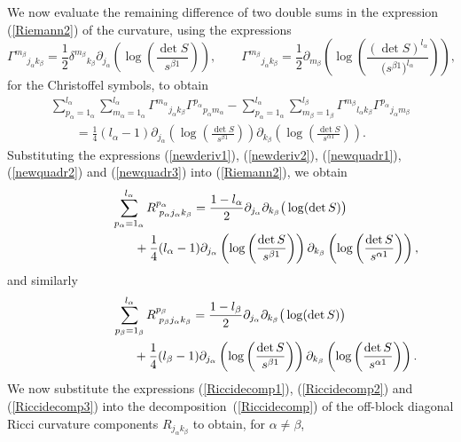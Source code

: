 \documentclass[pdftex]{sigma}
\numberwithin{equation}{section}
\newcommand{\jalpha}{j_{\alpha}}
\newcommand{\kbeta}{k_{\beta}}
\newcommand{\malpha}{m_{\alpha}}
\newcommand{\mbeta}{m_{\beta}}
\newcommand{\lbeta}{l_{\beta}}
\newcommand{\lalpha}{l_{\alpha}}
\newcommand{\palpha}{p_{\alpha}}
\newcommand{\pbeta}{p_{\beta}}
\begin{document}
We now evaluate the remaining difference of two double sums in the expression (\ref{Riemann2}) of the curvature, using the expressions
\[
{\Gamma^{\mbeta}}_{\jalpha \kbeta}=\frac{1}{2}{\delta^{\mbeta}}_{\kbeta}\partial_{\jalpha}\left(\log\left(\frac{\det S}{s^{\beta 1}}  \right)\right), \qquad {\Gamma^{\mbeta}}_{\jalpha \kbeta} = \frac{1}{2}\partial_{\mbeta}\left(\log\left(\frac{(\det S)^{\lalpha}}{\big(s^{\beta 1}\big)^{\lalpha}} \right)\right),
\]
for the Christoffel symbols, to obtain
\begin{gather}
\sum_{\palpha=1_{\alpha}}^{\lalpha}\sum_{\malpha = 1_{\alpha}}^{\lalpha}{\Gamma^{\malpha}}_{\jalpha \kbeta}{\Gamma^{\palpha}}_{\palpha \malpha}-\sum_{\palpha=1_{\alpha}}^{\lalpha}\sum_{\mbeta=1_{\beta}}^{\lbeta}{\Gamma^{\mbeta}}_{\lalpha \kbeta}{\Gamma^{\palpha}}_{\jalpha \mbeta}\nonumber\\
\qquad{} =\frac{1}{4}(\lalpha-1)\partial_{\jalpha}\left(\log \left(\frac{\det S}{s^{\beta 1}}\right)\right)\partial_{\kbeta}\left(\log\left(\frac{\det S}{s^{\alpha 1}} \right)\right).\label{newquadr3}
\end{gather}
Substituting the expressions (\ref{newderiv1}), (\ref{newderiv2}), (\ref{newquadr1}), (\ref{newquadr2}) and (\ref{newquadr3}) into (\ref{Riemann2}), we obtain
\begin{gather}
\sum_{\palpha=1_{\alpha}}^{\lalpha}R^{\palpha}_{{\phantom l} \palpha \jalpha \kbeta}= \frac{1-\lalpha}{2} \partial_{\jalpha}\partial_{\kbeta} \big(\log(\det S)\big)\nonumber\\
\hphantom{\sum_{\palpha=1_{\alpha}}^{\lalpha}R^{\palpha}_{{\phantom l} \palpha \jalpha \kbeta}=}{}
+\frac{1}{4}(\lalpha-1)\partial_{\jalpha}\left(\log\left(\frac{\det S}{s^{\beta 1}}\right)\right)\partial_{\kbeta}\left(\log\left(\frac{\det S}{s^{\alpha 1}}\right)\right),\label{Riccidecomp2}
\end{gather}
and similarly
\begin{gather}\label{Riccidecomp3}
\sum_{\pbeta=1_{\beta}}^{\lalpha}R^{\pbeta}_{{\phantom l} \pbeta \jalpha \kbeta}=\frac{1-\lbeta}{2}\partial_{\jalpha}\partial_{\kbeta} \big(\log(\det S)\big)\nonumber\\
\hphantom{\sum_{\pbeta=1_{\beta}}^{\lalpha}R^{\pbeta}_{{\phantom l} \pbeta \jalpha \kbeta}=}{}
+\frac{1}{4}(\lbeta-1)\partial_{\jalpha}\left(\log\left(\frac{\det S}{s^{\beta 1}}\right)\right)\partial_{\kbeta}\left(\log\left(\frac{\det S}{s^{\alpha 1}}\right)\right).
\end{gather}
We now substitute the expressions (\ref{Riccidecomp1}), (\ref{Riccidecomp2}) and (\ref{Riccidecomp3}) into the decomposition~(\ref{Riccidecomp}) of the off-block diagonal Ricci curvature components $R_{\jalpha \kbeta}$ to obtain, for $\alpha \neq \beta$,
\end{document}
